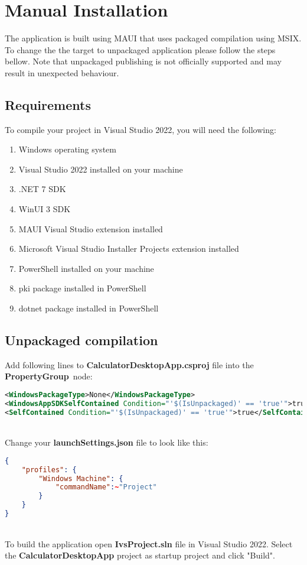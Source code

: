\section{Manual Installation}
The application is built using MAUI that uses packaged compilation using MSIX.
To change the the target to unpackaged application please follow the steps bellow.
Note that unpackaged publishing is not officially supported and may result in unexpected behaviour.

\subsection{Requirements}
To compile your project in Visual Studio 2022, you will need the following:

\begin{enumerate}
	\item Windows operating system
	\item Visual Studio 2022 installed on your machine
	\item .NET 7 SDK
	\item WinUI 3 SDK
	\item MAUI Visual Studio extension installed
	\item Microsoft Visual Studio Installer Projects extension installed
	\item PowerShell installed on your machine
	\item pki package installed in PowerShell
	\item dotnet package installed in PowerShell
\end{enumerate}

\subsection{Unpackaged compilation}
Add following lines to \textbf{CalculatorDesktopApp.csproj} file into the \textbf{PropertyGroup}~node:

\begin{lstlisting}[language=XML]
<WindowsPackageType>None</WindowsPackageType>
<WindowsAppSDKSelfContained Condition="'$(IsUnpackaged)' == 'true'">true</WindowsAppSDKSelfContained>
<SelfContained Condition="'$(IsUnpackaged)' == 'true'">true</SelfContained> 
\end{lstlisting}
~\\
Change your \textbf{launchSettings.json} file to look like this:
\newline
\begin{lstlisting}[language=json]
{
	"profiles": {
		"Windows Machine": {
			"commandName":~"Project"
		}
	}
}
\end{lstlisting}
~\\
To build the application open \textbf{IvsProject.sln} file in Visual Studio 2022. Select the \textbf{CalculatorDesktopApp} project as startup project and click "Build".

